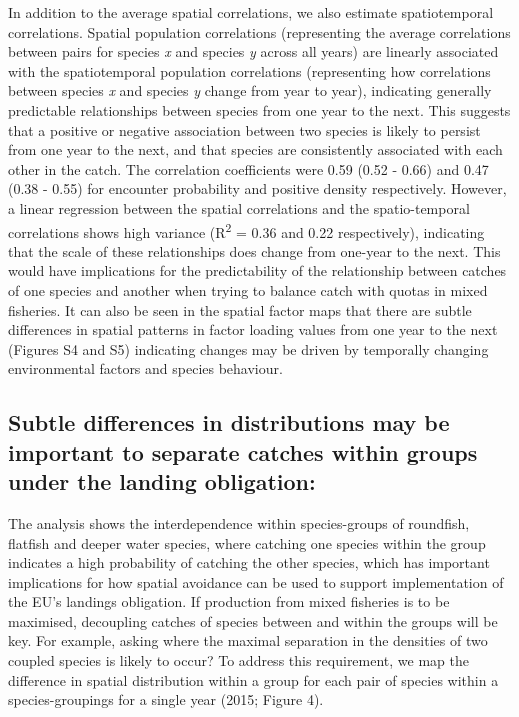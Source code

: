 \documentclass[fleqn,10pt]{wlscirep}
\begin{document}
\begin{linenumbers}
In addition to the average spatial correlations, we also estimate
spatiotemporal correlations. Spatial population correlations (representing the
average correlations between pairs for species \textit{x} and species
\textit{y} across all years) are linearly associated with the
spatiotemporal population correlations (representing how correlations between
species \textit{x} and species \textit{y} change from year to
year), indicating generally predictable relationships between species
from one year to the next. This suggests that a positive or negative
association between two species is likely to persist from one year to
the next, and that species are consistently associated with each other
in the catch. The correlation coefficients were 0.59 (0.52 - 0.66) and 0.47
(0.38 - 0.55) for encounter probability and positive density respectively.
However, a linear regression between the spatial correlations and the
spatio-temporal correlations shows high variance (R\textsuperscript{2} = 0.36
and 0.22 respectively), indicating that the scale of these relationships does
change from one-year to the next. This would have implications for the
predictability of the relationship between catches of one species and
another when trying to balance catch with quotas in mixed fisheries. It can
also be seen in the spatial factor maps that there are subtle differences in
spatial patterns in factor loading values from one year to the next (Figures S4
and S5) indicating changes may be driven by temporally changing environmental
factors and species behaviour.\\


\subsection*{Subtle differences in distributions may be important to separate
	catches within groups under the landing obligation:\\} The analysis shows
the interdependence within species-groups of roundfish, flatfish and deeper
water species, where catching one species within the group indicates a high
probability of catching the other species, which has important implications for
how spatial avoidance can be used to support implementation of the EU's
landings obligation. If production from mixed fisheries is to be maximised,
decoupling catches of species between and within the groups will be key. For
example, asking where the maximal separation in the densities of two coupled
species is likely to occur? To address this requirement, we map the difference
in spatial distribution within a group for each pair of species within a
species-groupings for a single year (2015; Figure 4). \\


\end{linenumbers}
\end{document}
